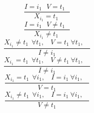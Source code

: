 $$\frac{I=i_{1} ~~~V=t_{1} ~~~}{X_{i_{1}}=t_{1}~}$$ $$\frac{I=i_{1} ~~~V \neq t_{1} ~~~}{X_{i_{1}} \neq t_{1}~}$$ $$\frac{X_{i_{1}} \neq t_{1}~~\forall t_{1},~~~~V=t_{1} ~\forall t_{1},~~~~}{I \neq i_{1} }$$ $$\frac{X_{i_{1}}=t_{1}~~\forall t_{1},~~~~V \neq t_{1} ~\forall t_{1},~~~~}{I \neq i_{1} }$$ $$\frac{X_{i_{1}}=t_{1}~~\forall i_{1},~~~~I=i_{1} ~\forall i_{1},~~~~}{V=t_{1} }$$ $$\frac{X_{i_{1}} \neq t_{1}~~\forall i_{1},~~~~I=i_{1} ~\forall i_{1},~~~~}{V \neq t_{1} }$$ 